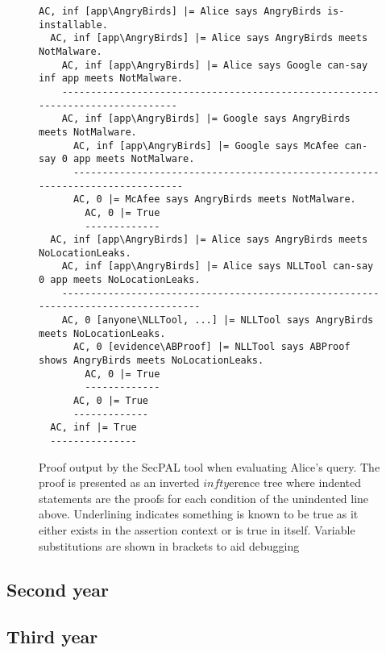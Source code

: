 \documentclass[report.tex]{subfiles}
\begin{document}
\begin{figure*}\label{secpal:exampleproof}
  \begin{lstlisting}[basicstyle=\footnotesize\ttfamily,columns=flexible,mathescape]
AC, inf [app\AngryBirds] |= Alice says AngryBirds is-installable.
  AC, inf [app\AngryBirds] |= Alice says AngryBirds meets NotMalware.
    AC, inf [app\AngryBirds] |= Alice says Google can-say inf app meets NotMalware.
    -------------------------------------------------------------------------------
    AC, inf [app\AngryBirds] |= Google says AngryBirds meets NotMalware.
      AC, inf [app\AngryBirds] |= Google says McAfee can-say 0 app meets NotMalware.
      ------------------------------------------------------------------------------
      AC, 0 |= McAfee says AngryBirds meets NotMalware.
        AC, 0 |= True
        -------------
  AC, inf [app\AngryBirds] |= Alice says AngryBirds meets NoLocationLeaks.
    AC, inf [app\AngryBirds] |= Alice says NLLTool can-say 0 app meets NoLocationLeaks.
    -----------------------------------------------------------------------------------
    AC, 0 [anyone\NLLTool, ...] |= NLLTool says AngryBirds meets NoLocationLeaks.
      AC, 0 [evidence\ABProof] |= NLLTool says ABProof shows AngryBirds meets NoLocationLeaks.
        AC, 0 |= True
        -------------
      AC, 0 |= True
      -------------
  AC, inf |= True
  ---------------
  \end{lstlisting}
  \caption{Proof output by the SecPAL tool when evaluating Alice's query.  The
    proof is presented as an inverted $infty$erence tree where indented statements
    are the proofs for each condition of the unindented line above.  Underlining
    indicates something is known to be true as it either exists in the assertion
    context or is true in itself. Variable substitutions are shown in brackets
    to aid debugging}
\end{figure*}

\subsection{Second year}


\subsection{Third year}
\end{document}
